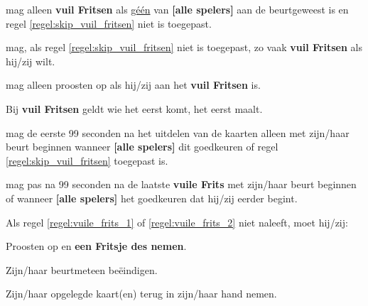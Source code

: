 \vervolgLijst{}
    \item \EenSpeler mag alleen \textbf{vuil Fritsen} als \ul{g\'e\'en} van \textbf{[alle spelers]} aan de beurt\footnotemark[1] geweest is en regel \ref{regel:skip_vuil_fritsen} niet is toegepast. 
\eindLijst{}

\vervolgLijst{}
    \item \EenSpeler mag, als regel \ref{regel:skip_vuil_fritsen} niet is toegepast, zo vaak \textbf{vuil Fritsen} als hij/zij wilt. 
\eindLijst{}

\vervolgLijst{}
    \item \EenSpeler mag alleen proosten op  als hij/zij aan het \textbf{vuil Fritsen} is.
\eindLijst{}

\vervolgLijst{}
    \item Bij \textbf{vuil Fritsen} geldt wie het eerst komt, het eerst maalt.
\eindLijst{}


\vervolgLijst{}
    \item \Willem mag de eerste 99 seconden na het uitdelen van de kaarten alleen met zijn/haar beurt beginnen wanneer \textbf{[alle spelers]} dit goedkeuren of regel \ref{regel:skip_vuil_fritsen} toegepast is. 
    \label{regel:vuile_frits_1}
\eindLijst{}

\vervolgLijst{}
    \item \Willem mag pas na 99 seconden na de laatste \textbf{vuile Frits} met zijn/haar beurt beginnen of wanneer \textbf{[alle spelers]} het goedkeuren dat hij/zij eerder begint.
    \label{regel:vuile_frits_2}
\eindLijst{}

\vervolgLijst{}
    \item Als \Willem regel \ref{regel:vuile_frits_1} of \ref{regel:vuile_frits_2} niet naleeft, moet hij/zij:
    \puntLijst{}
        \item Proosten op  en \textbf{een Fritsje des nemen}\footnotemark[3].
        \item Zijn/haar beurt\footnotemark[1] meteen beëindigen.
        \item Zijn/haar opgelegde kaart(en) terug in zijn/haar hand nemen.
    \eindPuntLijst{}
    \label{regel:kaarten_terugnemen_1}
\eindLijst{}


